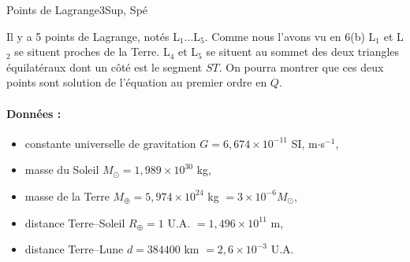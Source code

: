 \begin{exercise}{Points de Lagrange}{3}{Sup, Spé}
\begin{questions}
\end{questions}

Il y a 5 points de Lagrange, notés L$_1 \ldots$L$_5$. Comme nous l'avons vu en 6(b) L$_1$ et L$_2$ se situent proches de la Terre. L$_4$ et L$_5$ se situent au sommet des deux triangles équilatéraux dont un côté est le segment $ST$. On pourra montrer que ces deux points sont solution de l'équation au premier ordre en $Q$. 

\paragraph{Données :}
\begin{itemize}
    \item constante universelle de gravitation $G = 6,674 \times 10^{-11}$ SI, m$\cdot$s$^{-1}$,
    \item masse du Soleil $M_\odot = 1,989 \times 10^{30}$ kg,
    \item masse de la Terre $M_\oplus = 5,974 \times 10^{24}$ kg $= 3 \times 10^{-6} M_\odot$,
    \item distance Terre--Soleil $R_\oplus = 1$ U.A. $ = 1,496 \times 10^{11}$ m,
    \item distance Terre--Lune $d = 384 400$ km $= 2,6 \times 10^{-3}$ U.A.
\end{itemize}
\end{exercise}